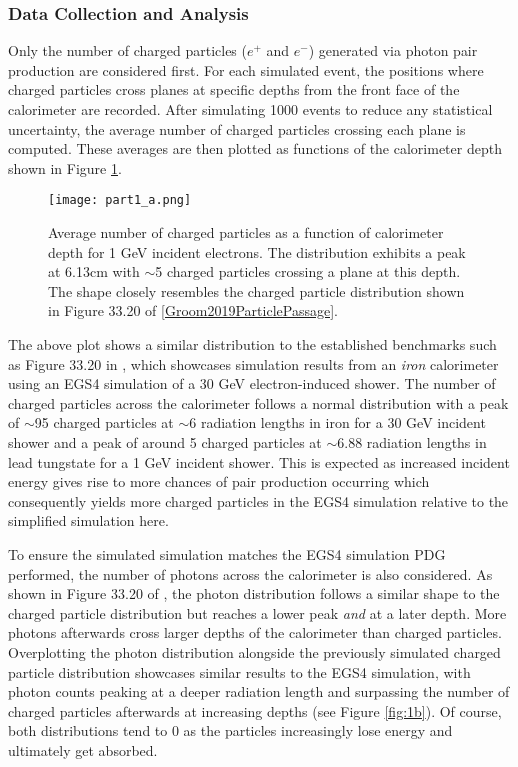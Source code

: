 \documentclass[twocolumn]{aastex631}
\begin{document}
\subsubsection{Data Collection and Analysis} 


Only the number of charged particles ($e^+$ and $e^-$) generated via photon pair
production are considered first. For each simulated event, the positions where
charged particles cross planes at specific depths from the front face of the
calorimeter are recorded. After simulating 1000 events to reduce any statistical
uncertainty, the average number of charged particles crossing each plane is
computed. These averages are then plotted as functions of the calorimeter depth
shown in Figure \ref{fig:1a}. 

 \begin{figure}[htp]
  \centering
    \texttt{[image: part1\_a.png]}
    \caption{ Average number of charged particles as a function of calorimeter
        depth for 1 GeV incident electrons. The distribution exhibits a peak
        at 6.13cm with $\sim$5 charged particles crossing a plane
        at this depth. The shape closely resembles the charged particle
        distribution shown in Figure 33.20 of \ref{Groom2019ParticlePassage}.}
    \label{fig:1a}
\end{figure}

The above plot shows a similar distribution to the established benchmarks such as Figure 33.20 in
\cite{Groom2019ParticlePassage}, which showcases simulation results 
from an \textit{iron} calorimeter using an EGS4 simulation
\citep{Agostinelli2003} of a 30 GeV electron-induced shower. The number of
charged particles across the calorimeter follows a normal distribution with a
peak of $\sim$95 charged particles at $\sim$6 radiation lengths in iron for a
30 GeV incident shower and a peak of around 5 charged particles at 
$\sim$6.88 radiation lengths in lead tungstate for a 1 GeV incident shower. This
is expected as increased incident energy gives rise to more chances of
pair production occurring which consequently yields more charged particles in the EGS4
simulation relative to the simplified simulation here. 

To ensure the simulated simulation matches the EGS4 simulation PDG performed,
the number of photons across the calorimeter is also considered. As shown in
Figure 33.20 of \cite{Groom2019ParticlePassage}, the photon distribution follows
a similar shape to the charged particle distribution but reaches a lower peak 
\textit{and} at a later depth. More photons afterwards cross larger 
depths of the calorimeter than charged particles. Overplotting the photon
distribution alongside the previously simulated charged particle distribution
showcases similar results to the EGS4 simulation, with photon counts peaking at 
a deeper radiation length and surpassing the number of charged particles
afterwards at increasing depths (see Figure \ref{fig:1b}). Of course, both distributions tend to 0 as the particles
increasingly lose energy and ultimately get absorbed. 
\end{document}

